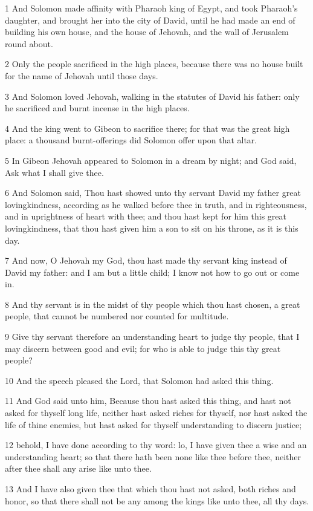 \par 1 And Solomon made affinity with Pharaoh king of Egypt, and took Pharaoh's daughter, and brought her into the city of David, until he had made an end of building his own house, and the house of Jehovah, and the wall of Jerusalem round about.
\par 2 Only the people sacrificed in the high places, because there was no house built for the name of Jehovah until those days.
\par 3 And Solomon loved Jehovah, walking in the statutes of David his father: only he sacrificed and burnt incense in the high places.
\par 4 And the king went to Gibeon to sacrifice there; for that was the great high place: a thousand burnt-offerings did Solomon offer upon that altar.
\par 5 In Gibeon Jehovah appeared to Solomon in a dream by night; and God said, Ask what I shall give thee.
\par 6 And Solomon said, Thou hast showed unto thy servant David my father great lovingkindness, according as he walked before thee in truth, and in righteousness, and in uprightness of heart with thee; and thou hast kept for him this great lovingkindness, that thou hast given him a son to sit on his throne, as it is this day.
\par 7 And now, O Jehovah my God, thou hast made thy servant king instead of David my father: and I am but a little child; I know not how to go out or come in.
\par 8 And thy servant is in the midst of thy people which thou hast chosen, a great people, that cannot be numbered nor counted for multitude.
\par 9 Give thy servant therefore an understanding heart to judge thy people, that I may discern between good and evil; for who is able to judge this thy great people?
\par 10 And the speech pleased the Lord, that Solomon had asked this thing.
\par 11 And God said unto him, Because thou hast asked this thing, and hast not asked for thyself long life, neither hast asked riches for thyself, nor hast asked the life of thine enemies, but hast asked for thyself understanding to discern justice;
\par 12 behold, I have done according to thy word: lo, I have given thee a wise and an understanding heart; so that there hath been none like thee before thee, neither after thee shall any arise like unto thee.
\par 13 And I have also given thee that which thou hast not asked, both riches and honor, so that there shall not be any among the kings like unto thee, all thy days.

